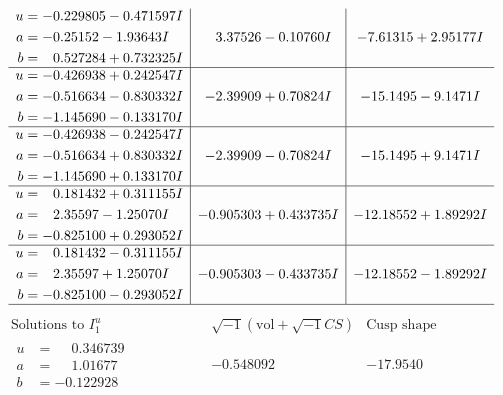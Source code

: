\documentclass[1p]{elsarticle_modified}
\theoremstyle{definition}
\newcommand{\I}{\sqrt{-1}}
\begin{document}
$$\begin{array}{c|c|c}
\begin{aligned}
u &= -0.229805 - 0.471597 I \\
a &= -0.25152 - 1.93643 I \\
b &= \phantom{-}0.527284 + 0.732325 I\end{aligned}
 & \phantom{-}3.37526 - 0.10760 I & -7.61315 + 2.95177 I \\ \hline\begin{aligned}
u &= -0.426938 + 0.242547 I \\
a &= -0.516634 - 0.830332 I \\
b &= -1.145690 - 0.133170 I\end{aligned}
 & -2.39909 + 0.70824 I & -15.1495 - 9.1471 I \\ \hline\begin{aligned}
u &= -0.426938 - 0.242547 I \\
a &= -0.516634 + 0.830332 I \\
b &= -1.145690 + 0.133170 I\end{aligned}
 & -2.39909 - 0.70824 I & -15.1495 + 9.1471 I \\ \hline\begin{aligned}
u &= \phantom{-}0.181432 + 0.311155 I \\
a &= \phantom{-}2.35597 - 1.25070 I \\
b &= -0.825100 + 0.293052 I\end{aligned}
 & -0.905303 + 0.433735 I & -12.18552 + 1.89292 I \\ \hline\begin{aligned}
u &= \phantom{-}0.181432 - 0.311155 I \\
a &= \phantom{-}2.35597 + 1.25070 I \\
b &= -0.825100 - 0.293052 I\end{aligned}
 & -0.905303 - 0.433735 I & -12.18552 - 1.89292 I\\
 \hline 
 \end{array}$$\newpage$$\begin{array}{c|c|c}  
\text{Solutions to }I^u_{1}& \I (\text{vol} + \sqrt{-1}CS) & \text{Cusp shape}\\
 \hline 
\begin{aligned}
u &= \phantom{-}0.346739\phantom{ +0.000000I} \\
a &= \phantom{-}1.01677\phantom{ +0.000000I} \\
b &= -0.122928\phantom{ +0.000000I}\end{aligned}
 & -0.548092\phantom{ +0.000000I} & -17.9540\phantom{ +0.000000I} \\ \hline\begin{aligned}

\end{aligned}
\end{array}$$
\end{document}
